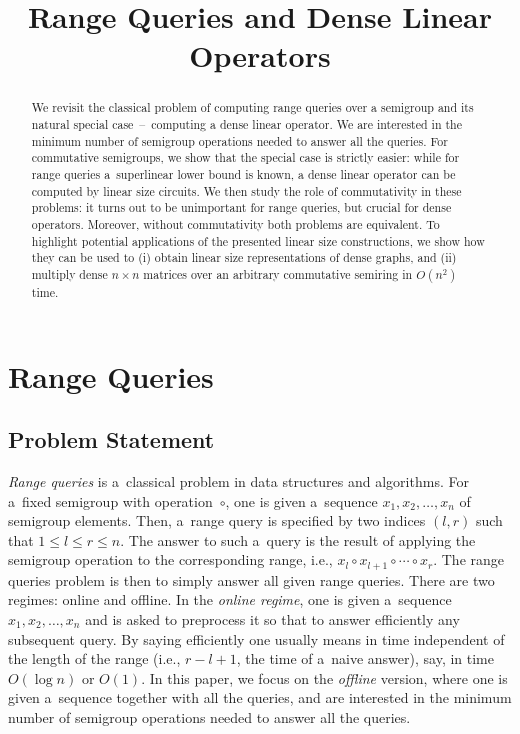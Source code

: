 \documentclass[11pt,letterpaper]{article}
\begin{document}
\sloppy
\author{}
\title{Range Queries and Dense Linear Operators}
\maketitle


\begin{abstract}
We revisit the classical problem of computing range queries over a semigroup and
its natural special case~--~computing a dense linear operator. We are interested
in the minimum number of semigroup operations needed to answer all the queries.
For commutative semigroups, we show that the special case is strictly easier:
while for range queries a~superlinear lower bound is known, a dense linear
operator can be computed by linear size circuits. We then study the role of
commutativity in these problems: it turns out to be unimportant for range
queries, but crucial for dense operators. Moreover, without commutativity both
problems are equivalent. To highlight potential applications of the presented
linear size constructions, we show how they can be used to (i) obtain linear
size representations of dense graphs, and (ii) multiply dense $n\times n$
matrices over an arbitrary commutative semiring in $O(n^2)$ time.
\end{abstract}

\tableofcontents

\section{Range Queries}
\subsection{Problem Statement}
{\em Range queries} is a~classical problem in data structures and algorithms. For a~fixed semigroup with operation~$\circ$, one is given a~sequence $x_1, x_2, \dotsc, x_n$ of semigroup elements. Then, a~range query is specified by two indices $(l,r)$ such that $1 \le l \le r \le n$. The answer to such a~query is the result of applying the semigroup operation to the corresponding range, i.e., $x_l \circ x_{l+1} \circ \dotsb \circ x_r$. The range queries problem is then to simply answer all given range queries. There are two regimes: online and offline. In the {\em online regime}, one is given a~sequence $x_1, x_2, \dotsc, x_n$ and is asked to preprocess it so that to answer efficiently any subsequent query. By saying efficiently one usually means in time independent of the length of the range (i.e., $r-l+1$, the time of a~naive answer), say, in time $O(\log n)$ or $O(1)$. In this paper, we focus on the {\em offline} version, where one is given a~sequence together with all the queries, and are interested in the minimum number of semigroup operations needed to answer all the queries.
\end{document}
